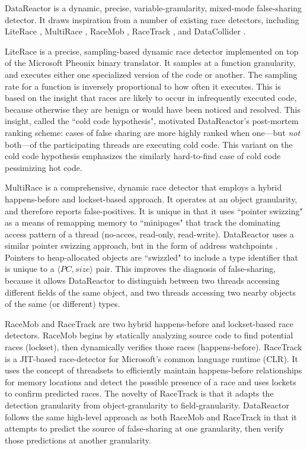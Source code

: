 \documentclass{sig-alternate}
\newcommand{\Toolname}{DataReactor}
\begin{document}
\Toolname{} is a dynamic, precise, variable-granularity, mixed-mode false-sharing detector. It draws inspiration
from a number of existing race detectors, including LiteRace \cite{LiteRace}, MultiRace \cite{MultiRace},
RaceMob \cite{RaceMob}, RaceTrack \cite{RaceTrack}, and DataCollider \cite{DataCollider}.

LiteRace \cite{LiteRace} is a precise, sampling-based dynamic race detector implemented on top of the Microsoft
Pheonix binary translator. It samples at a function granularity, and executes either one specialized version of the
code or another. The sampling rate for a function is inversely proportional to how often it executes. This is based
on the insight that races are likely to occur in infrequently executed code, because otherwise they are benign or
would have been noticed and resolved. This insight, called the ``cold code hypothesis", motivated \Toolname's
post-mortem ranking scheme: cases of false sharing are more highly ranked when one---but \emph{not} both---of
the participating threads are executing cold code. This variant on the cold code hypothesis emphasizes the similarly
hard-to-find case of cold code pessimizing hot code.

MultiRace \cite{MultiRace} is a comprehensive, dynamic race detector that employs a hybrid happens-before and
lockset-based approach. It operates at an object granularity, and therefore reports false-positives. It is unique
in that it uses ``pointer swizzing" as a means of remapping memory to ``minipages" that track the dominating
access pattern of a thread (no-acces, read-only, read-write). \Toolname{} uses a similar pointer swizzing approach, but
in the form of address watchpoints \cite{AddressWatchpoints}. Pointers to heap-allocated objects are ``swizzled" to
include a type identifier that is unique to a $\langle PC,size \rangle$ pair. This improves the diagnosis of false-sharing,
because it allows \Toolname{} to distinguish between two threads accessing different fields of the same object, and
two threads accessing two nearby objects of the same (or different) types.

RaceMob \cite{RaceMob} and RaceTrack \cite{RaceTrack} are two hybrid happens-before and lockset-based race detectors.
RaceMob begins by statically analyzing source code to find potential races (lockset), then dynamically verifies those races
(happens-before). RaceTrack is a JIT-based race-detector for Microsoft's common language runtime (CLR). It uses the
concept of threadsets to efficiently maintain happens-before relationships for memory locations and detect the possible
presence of a race and uses lockets to confirm predicted races. The novelty of RaceTrack is that it adapts the detection
granularity from object-granularity to field-granularity. \Toolname{} follows the same high-level approach as both RaceMob
and RaceTrack in that it attempts to predict the source of false-sharing at one granularity, then verify those predictions 
at another granularity.
\end{document}
